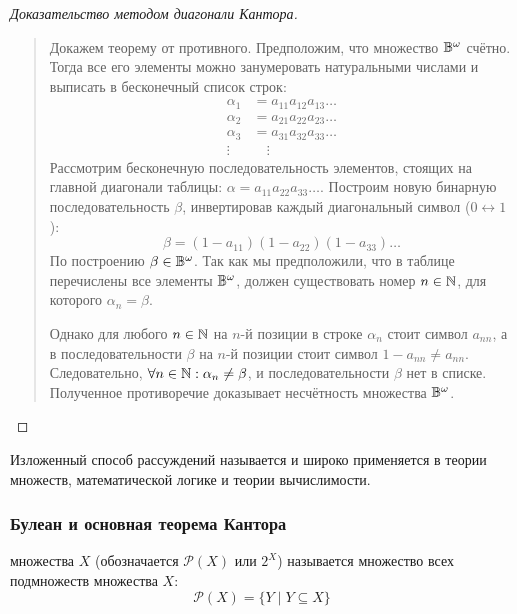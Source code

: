 \begin{proof}[Доказательство методом диагонали Кантора]~\\
    \begin{quote}
        Докажем теорему от противного. Предположим, что множество $\mathbb{B}^\omega$ 
        счётно. Тогда все его элементы можно занумеровать натуральными 
        числами и выписать в бесконечный список строк:
        \begin{align*}
            \alpha_1 &= a_{11} a_{12} a_{13} \dots \\
            \alpha_2 &= a_{21} a_{22} a_{23} \dots \\
            \alpha_3 &= a_{31} a_{32} a_{33} \dots \\
            \vdots \;& \quad \vdots
        \end{align*}
        Рассмотрим бесконечную последовательность элементов, стоящих на 
        главной диагонали таблицы: $\alpha = a_{11} a_{22} a_{33} \dots$.
        Построим новую бинарную последовательность $\beta$, инвертировав 
        каждый диагональный символ ($0 \leftrightarrow 1$):
        \[
            \beta = (1 - a_{11})(1 - a_{22})(1 - a_{33}) \dots
        \]
        По построению $\beta \in \mathbb{B}^\omega$. Так как мы предположили, что в 
        таблице перечислены все элементы $\mathbb{B}^\omega$, должен существовать 
        номер $n \in \mathbb{N}$, для которого $\alpha_n = \beta$.

        Однако для любого $n \in \mathbb{N}$ на $n$-й позиции в строке $\alpha_n$ 
        стоит символ $a_{nn}$, а в последовательности $\beta$ на $n$-й 
        позиции стоит символ $1 - a_{nn} \neq a_{nn}$. Следовательно, 
        $\forall n \in \mathbb{N} : \alpha_n \neq \beta$, и последовательности 
        $\beta$ нет в списке. Полученное противоречие доказывает 
        несчётность множества $\mathbb{B}^\omega$.
    \end{quote}
\end{proof}

\begin{remark}
    Изложенный способ рассуждений называется  и широко применяется в теории множеств, математической логике 
    и теории вычислимости.
\end{remark}

\subsubsection{Булеан и основная теорема Кантора}

\begin{definition}
     множества $X$ (обозначается $\mathcal{P}(X)$ или 
    $2^X$) называется множество всех подмножеств множества $X$:
    \[
        \mathcal{P}(X) = \{Y \mid Y \subseteq X\}
    \]
\end{definition}

